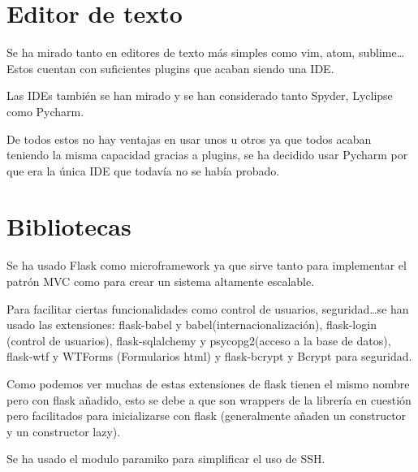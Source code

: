 \section{Editor de texto}

Se ha mirado tanto en editores de texto más simples como vim, atom, sublime\ldots Estos cuentan con suficientes plugins que acaban siendo una IDE.

Las IDEs también se han mirado y se han considerado tanto Spyder, Lyclipse como Pycharm.

De todos estos no hay ventajas en usar unos u otros ya que todos acaban teniendo la misma capacidad gracias a plugins, se ha decidido usar Pycharm por que era la única IDE que todavía no se había probado.


\section{Bibliotecas}

Se ha usado Flask como microframework ya que sirve tanto para implementar el patrón MVC como para crear un sistema altamente escalable. 

Para facilitar ciertas funcionalidades como control de usuarios, seguridad\ldots se han usado las extensiones: flask-babel y babel(internacionalización), flask-login (control de usuarios), flask-sqlalchemy y psycopg2(acceso a la base de datos), flask-wtf y WTForms (Formularios html) y flask-bcrypt y Bcrypt para seguridad.

Como podemos ver muchas de estas extensiones de flask tienen el mismo nombre pero con flask añadido, esto se debe a que son wrappers de la librería en cuestión pero facilitados para inicializarse con flask (generalmente añaden un constructor y un constructor lazy).

Se ha usado el modulo paramiko para simplificar el uso de SSH.

